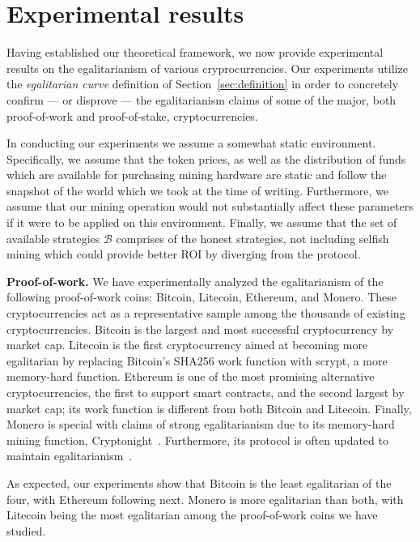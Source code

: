 \section{Experimental results}\label{sec:experiments}

Having established our theoretical framework, we now provide experimental
results on the egalitarianism of various cryprocurrencies. Our experiments
utilize the \emph{egalitarian curve} definition of Section~\ref{sec:definition}
in order to concretely confirm --- or disprove --- the egalitarianism claims of
some of the major, both proof-of-work and proof-of-stake, cryptocurrencies.

In conducting our experiments we assume a somewhat static environment.
Specifically, we assume that the token prices, as well as the distribution of
funds which are available for purchasing mining hardware are static and follow
the snapshot of the world which we took at the time of writing. Furthermore, we
assume that our mining operation would not substantially affect these
parameters if it were to be applied on this environment. Finally, we assume
that the set of available strategies $\mathcal{B}$ comprises of the honest
strategies, \eg not including selfish mining which could provide better ROI
by diverging from the protocol.

\noindent\textbf{Proof-of-work.}
\noindent
We have experimentally analyzed the egalitarianism of the following
proof-of-work coins: Bitcoin, Litecoin, Ethereum, and Monero. These
cryptocurrencies act as a representative sample among the thousands of existing
cryptocurrencies. Bitcoin is the largest and most successful cryptocurrency by
market cap. Litecoin is the first cryptocurrency aimed at becoming more
egalitarian by replacing Bitcoin's SHA256 work function with scrypt, a more
memory-hard function. Ethereum is one of the most promising alternative
cryptocurrencies, the first to support smart contracts, and the second largest
by market cap; its work function is different from both Bitcoin and Litecoin.
Finally, Monero is special with claims of strong egalitarianism due to its
memory-hard mining function, Cryptonight~\cite{van2013cryptonote}. Furthermore, its protocol is often
updated to maintain
egalitarianism~\cite{monero-hard-asic}.

As expected, our experiments show that Bitcoin is the least egalitarian of the
four, with Ethereum following next. Monero is more egalitarian than both, with
Litecoin being the most egalitarian among the proof-of-work coins
we have studied. 

